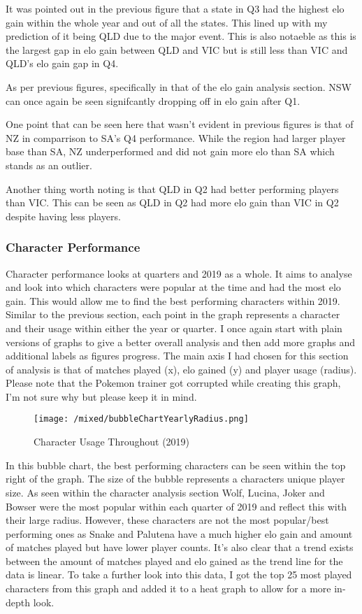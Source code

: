 \documentclass[11pt, oneside, a4paper]{article}
\begin{document}
It was pointed out in the previous figure that a state in Q3 had the highest elo gain within the whole year and out of all the states. This lined up with my prediction of it being QLD due to the major event. This is also notaeble as this is the largest gap in elo gain between QLD and VIC but is still less than VIC and QLD's elo gain gap in Q4.

As per previous figures, specifically in that of the elo gain analysis section. NSW can once again be seen signifcantly dropping off in elo gain after Q1. 

One point that can be seen here that wasn't evident in previous figures is that of NZ in comparrison to SA's Q4 performance. While the region had larger player base than SA, NZ underperformed and did not gain more elo than SA which stands as an outlier. 

Another thing worth noting is that QLD in Q2 had better performing players than VIC. This can be seen as QLD in Q2 had more elo gain than VIC in Q2 despite having less players.

\newpage
\subsubsection{Character Performance}
Character performance looks at quarters and 2019 as a whole. It aims to analyse and look into which characters were popular at the time and had the most elo gain. This would allow me to find the best performing characters within 2019. Similar to the previous section, each point in the graph represents a character and their usage within either the year or quarter. I once again start with plain versions of graphs to give a better overall analysis and then add more graphs and additional labels as figures progress. The main axis I had chosen for this section of analysis is that of matches played (x), elo gained (y) and player usage (radius). Please note that the Pokemon trainer got corrupted while creating this graph, I'm not sure why but please keep it in mind.

\begin{figure}[!ht]
	\centerline{\texttt{[image: /mixed/bubbleChartYearlyRadius.png]}}
	\caption{Character Usage Throughout (2019)}
	\label{fig:figure13}
\end{figure}
In this bubble chart, the best performing characters can be seen within the top right of the graph. The size of the bubble represents a characters unique player size. As seen within the character analysis section Wolf, Lucina, Joker and Bowser were the most popular within each quarter of 2019 and reflect this with their large radius. However, these characters are not the most popular/best performing ones as Snake and Palutena have a much higher elo gain and amount of matches played but have lower player counts. It's also clear that a trend exists between the amount of matches played and elo gained as the trend line for the data is linear. To take a further look into this data, I got the top 25 most played characters from this graph and added it to a heat graph to allow for a more in-depth look.
\end{document}
